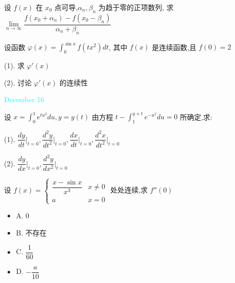 \begin{example}[][Exam: 38.3.1]
	设 $f(x)$ 在 $x_{0}$ 点可导,$\alpha_{n},\beta_{n}$ 为趋于零的正项数列, 
	求 $\lim\limits_{n\to\infty}\dfrac{f(x_{0}+\alpha_{n})-f(x_{0}-\beta_{n})}{\alpha_{n}+\beta_{n}}$
\end{example}

\begin{solution}
	
\end{solution}

\begin{example}[][Exam: 38.3.2]
	设函数 $\displaystyle{\varphi(x)=\int_{0}^{\sin x}f(tx^{2})dt}$, 其中 $f(x)$ 是连续函数,且 $f(0)=2$

(1). 求 $\varphi'(x)$

(2). 讨论 $\varphi'(x)$ 的连续性
\end{example}

\begin{solution}
	
\end{solution}


\textcolor{cyan}{December 16}

\begin{example}[][Exam: 38.3.3]
	设 $x=\int_{0}^{1}e^{tu^{2}}du,y=y(t)$ 由方程 $\displaystyle{t-\int_{1}^{y+t}e^{-u^{2}}du=0}$ 所确定,求:

(1). $\dfrac{dy}{dt}\big|_{t=0},\dfrac{d^{2}y}{dt^{2}}\big|_{t=0},\dfrac{dx}{dt}\big|_{t=0},\dfrac{d^{2}x}{dt^{2}}\big|_{t=0}$

(2). $\dfrac{dy}{dx}\big|_{t=0},\dfrac{d^{2}y}{dx^{2}}\big|_{t=0}$
\end{example}

\begin{solution}
	
\end{solution}

\begin{example}[][Exam: 38.3.4]
	设 $f(x)=
	\begin{cases}
		\dfrac{x-\sin x}{x^{3}} & x\neq 0\\
		a & x=0
	\end{cases}$ 处处连续,求 $f''(0)$
	\begin{itemize}
		\item A. $0$
		\item B. 不存在
		\item C. $\dfrac{1}{60}$
		\item D. $-\dfrac{a}{10}$
	\end{itemize}
\end{example}

